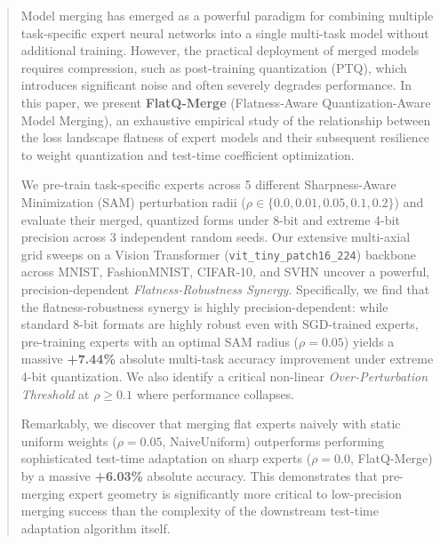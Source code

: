 \begin{abstract}
Model merging has emerged as a powerful paradigm for combining multiple task-specific expert neural networks into a single multi-task model without additional training. However, the practical deployment of merged models requires compression, such as post-training quantization (PTQ), which introduces significant noise and often severely degrades performance. In this paper, we present \textbf{FlatQ-Merge} (Flatness-Aware Quantization-Aware Model Merging), an exhaustive empirical study of the relationship between the loss landscape flatness of expert models and their subsequent resilience to weight quantization and test-time coefficient optimization.

We pre-train task-specific experts across 5 different Sharpness-Aware Minimization (SAM) perturbation radii ($\rho \in \{0.0, 0.01, 0.05, 0.1, 0.2\}$) and evaluate their merged, quantized forms under 8-bit and extreme 4-bit precision across 3 independent random seeds. Our extensive multi-axial grid sweeps on a Vision Transformer (\texttt{vit\_tiny\_patch16\_224}) backbone across MNIST, FashionMNIST, CIFAR-10, and SVHN uncover a powerful, precision-dependent \emph{Flatness-Robustness Synergy}. Specifically, we find that the flatness-robustness synergy is highly precision-dependent: while standard 8-bit formats are highly robust even with SGD-trained experts, pre-training experts with an optimal SAM radius ($\rho=0.05$) yields a massive \textbf{+7.44\%} absolute multi-task accuracy improvement under extreme 4-bit quantization. We also identify a critical non-linear \emph{Over-Perturbation Threshold} at $\rho \ge 0.1$ where performance collapses.

Remarkably, we discover that merging flat experts naively with static uniform weights ($\rho=0.05$, NaiveUniform) outperforms performing sophisticated test-time adaptation on sharp experts ($\rho=0.0$, FlatQ-Merge) by a massive \textbf{+6.03\%} absolute accuracy. This demonstrates that pre-merging expert geometry is significantly more critical to low-precision merging success than the complexity of the downstream test-time adaptation algorithm itself.
\end{abstract}
